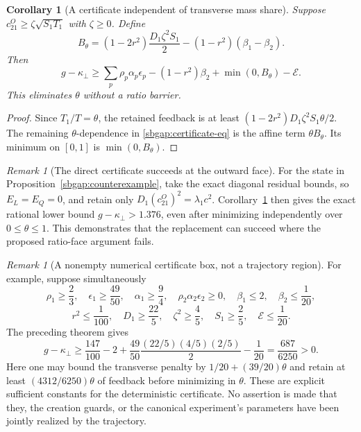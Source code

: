 \documentclass{article} %
\theoremstyle{plain}
\newtheorem{corollary}[theorem]{Corollary}
\theoremstyle{definition}
\theoremstyle{remark}
\newtheorem{remark}[theorem]{Remark}
\begin{document}
\begin{corollary}[A certificate independent of transverse mass share]
\label{sbgap:theta-free}
Suppose $c_{21}^O\ge\zeta\sqrt{S_1T_1}$ with $\zeta\ge0$. Define
\[
 B_\theta=(1-2r^2)\frac{D_1\zeta^2S_1}{2}
                  -(1-r^2)(\beta_1-\beta_2).
\]
Then
\begin{equation}\label{sbgap:theta-free-eq}
 g-\kappa_\perp\ge
 \sum_p\rho_p\alpha_p\epsilon_p
 -(1-r^2)\beta_2+\min(0,B_\theta)-\mathcal E.
\end{equation}
This eliminates $\theta$ without a ratio barrier.
\end{corollary}
\begin{proof}
Since $T_1/T=\theta$, the retained feedback is at least
$(1-2r^2)D_1\zeta^2S_1\theta/2$. The remaining $\theta$-dependence in
\eqref{sbgap:certificate-eq} is the affine term $\theta B_\theta$.
Its minimum on $[0,1]$ is $\min(0,B_\theta)$.
\end{proof}

\begin{remark}[The direct certificate succeeds at the outward face]
For the state in Proposition~\ref{sbgap:counterexample}, take the exact
diagonal residual bounds, so $E_L=E_Q=0$, and retain only
$D_1(c_{21}^O)^2=\lambda_1c^2$. Corollary~\ref{sbgap:theta-free}
then gives the exact rational lower bound
$g-\kappa_\perp>1.376$, even after minimizing independently over
$0\le\theta\le1$. This demonstrates that the replacement can succeed where
the proposed ratio-face argument fails.
\end{remark}

\begin{remark}[A nonempty numerical certificate box, not a trajectory region]
For example, suppose simultaneously
\[
 \rho_1\ge\frac23,\quad \epsilon_1\ge\frac{49}{50},\quad
 \alpha_1\ge\frac94,\quad \rho_2\alpha_2\epsilon_2\ge0,\quad
 \beta_1\le2,\quad \beta_2\le\frac1{20},
\]
\[
 r^2\le\frac1{100},\quad D_1\ge\frac{22}{5},\quad
 \zeta^2\ge\frac45,\quad S_1\ge\frac25,\quad
 \mathcal E\le\frac1{20}.
\]
The preceding theorem gives
\[
 g-\kappa_\perp\ge
 \frac{147}{100}-2
 +\frac{49}{50}\frac{(22/5)(4/5)(2/5)}2-\frac1{20}
 =\frac{687}{6250}>0.
\]
Here one may bound the transverse penalty by
$1/20+(39/20)\theta$ and retain at least
$(4312/6250)\theta$ of feedback before minimizing in $\theta$.
These are explicit sufficient constants for the deterministic certificate.
No assertion is made that they, the creation guards, or the canonical
experiment's parameters have been jointly realized by the trajectory.
\end{remark}
\end{document}
